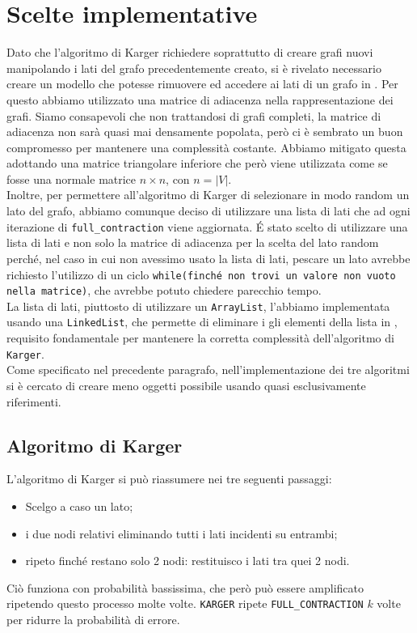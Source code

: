 \section{Scelte implementative}
Dato che l'algoritmo di Karger richiedere soprattutto di creare grafi nuovi manipolando i lati del grafo precedentemente creato, si è rivelato necessario creare un modello che potesse rimuovere ed accedere ai lati di un grafo in . Per questo abbiamo utilizzato una matrice di adiacenza nella rappresentazione dei grafi. Siamo consapevoli che non trattandosi di grafi completi, la matrice di adiacenza non sarà quasi mai densamente popolata, però ci è sembrato un buon compromesso per mantenere una complessità costante. Abbiamo mitigato questa  adottando una matrice triangolare inferiore che però viene utilizzata come se fosse una normale matrice $n\times n$, con $n = |V|$. \\
Inoltre, per permettere all'algoritmo di Karger di selezionare in modo random un lato del grafo, abbiamo comunque deciso di utilizzare una lista di lati che ad ogni iterazione di \texttt{full\_contraction} viene aggiornata. \'E stato scelto di utilizzare una lista di lati e non solo la matrice di adiacenza per la scelta del lato random perché, nel caso in cui non avessimo usato la lista di lati, pescare un lato avrebbe richiesto l'utilizzo di un ciclo \texttt{while(finché non trovi un valore non vuoto nella matrice)}, che avrebbe potuto chiedere parecchio tempo.\\
La lista di lati, piuttosto di utilizzare un \texttt{ArrayList}, l'abbiamo implementata usando una \texttt{LinkedList}, che permette di eliminare i gli elementi della lista in , requisito fondamentale per mantenere la corretta complessità dell'algoritmo di \texttt{Karger}.\\ 
Come specificato nel precedente paragrafo, nell'implementazione dei tre algoritmi si è cercato di creare meno oggetti possibile usando quasi esclusivamente riferimenti. 

\subsection{Algoritmo di Karger}
L'algoritmo di Karger si può riassumere nei tre seguenti passaggi:
\begin{itemize}
	\item Scelgo a caso un lato;
	\item {} i due nodi relativi eliminando tutti i lati incidenti su entrambi;
	\item ripeto finché restano solo 2 nodi: restituisco i lati tra quei 2 nodi.
\end{itemize}
Ciò funziona con probabilità bassissima, che però può essere amplificato ripetendo questo processo molte volte. \eqcapo
{}
\texttt{KARGER} ripete \texttt{FULL\_CONTRACTION} $k$ volte per ridurre la probabilità di errore.


